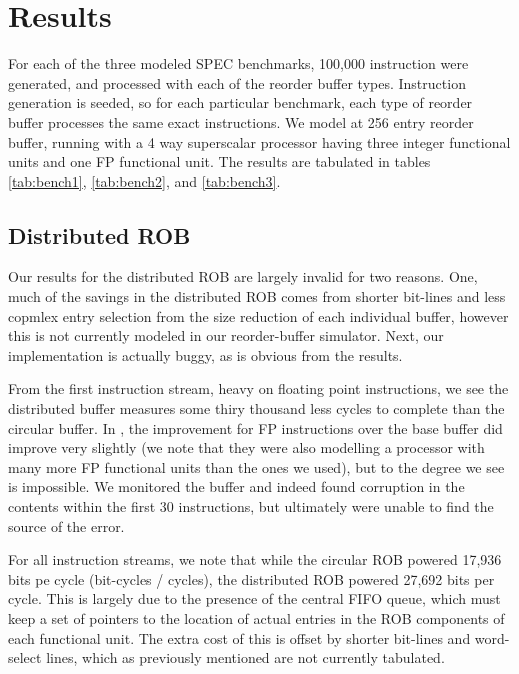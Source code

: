 \def\topfraction{.9}
\def\floatpagefraction{.8}

\section{Results}
For each of the three modeled SPEC benchmarks, 100,000 instruction were generated, and processed with each of the reorder buffer types. Instruction generation is seeded, so for each particular benchmark, each type of reorder buffer processes the same exact instructions. We model at 256 entry reorder buffer, running with a 4 way superscalar processor having three integer functional units and one FP functional unit. The results are tabulated in tables \ref{tab:bench1}, \ref{tab:bench2}, and \ref{tab:bench3}.

\subsection{Distributed ROB}

Our results for the distributed ROB are largely invalid for two reasons. One, much of the savings in the distributed ROB comes from shorter bit-lines and less copmlex entry selection from the size reduction of each individual buffer, however this is not currently modeled in our reorder-buffer simulator. Next, our implementation is actually buggy, as is obvious from the results.

From the first instruction stream, heavy on floating point instructions, we see the distributed buffer measures some thiry thousand less cycles to complete than the circular buffer. In \cite{kucuk4}, the improvement for FP instructions over the base buffer did improve very slightly (we note that they were also modelling a processor with many more FP functional units than the ones we used), but to the degree we see is impossible. We monitored the buffer and indeed found corruption in the contents within the first 30 instructions, but ultimately were unable to find the source of the error.

For all instruction streams, we note that while the circular ROB powered 17,936 bits pe cycle (bit-cycles / cycles), the distributed ROB powered 27,692 bits per cycle. This is largely due to the presence of the central FIFO queue, which must keep a set of pointers to the location of actual entries in the ROB components of each functional unit. The extra cost of this is offset by shorter bit-lines and word-select lines, which as previously mentioned are not currently tabulated.


